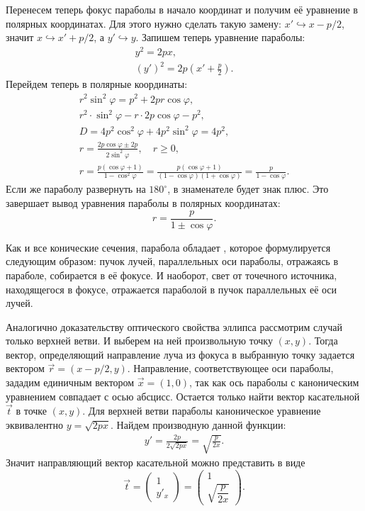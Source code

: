 Перенесем теперь фокус параболы в начало координат и получим её уравнение в полярных координатах. Для этого нужно сделать такую замену: $x' \hookrightarrow x - p/2$, значит $x \hookrightarrow x' + p/2$, а $y' \hookrightarrow y$. Запишем теперь уравнение параболы:
\begin{gather*}
	y^2 = 2px,\\
	(y')^2 = 2 p \left(x' + \frac{p}{2} \right).
\end{gather*}
Перейдем теперь в полярные координаты:
\begin{gather*}
	r^2 \sin^2 \varphi = p^2 + 2pr\cos \varphi,\\
	r^2 \cdot \sin^2 \varphi - r \cdot 2 p  \cos \varphi - p^2,\\
	D = 4p^2 \cos^2 \varphi + 4 p^2 \sin^2 \varphi = 4 p^2,\\
	r = \frac{2p \cos \varphi \pm 2p}{2\sin^2 \varphi}, \quad r \geqslant 0,\\
	r = \frac{p (\cos \varphi + 1)}{1 - \cos^2 \varphi} = \frac{p (\cos \varphi + 1)}{(1 - \cos\varphi)(1 + \cos\varphi)} = \frac{p}{1 - \cos \varphi}.
\end{gather*}
Если же параболу развернуть на $180^\circ$, в знаменателе будет знак плюс. Это завершает вывод уравнения параболы в полярных координатах:
\begin{equation}
	r = \frac{p}{1 \pm \cos \varphi}.
\end{equation}

Как и все конические сечения, парабола обладает , которое формулируется следующим образом: пучок лучей, параллельных оси параболы, отражаясь в параболе, собирается в её фокусе. И наоборот, свет от точечного источника, находящегося в фокусе, отражается параболой в пучок параллельных её оси лучей.

Аналогично доказательству оптического свойства эллипса рассмотрим случай только верхней ветви. И выберем на ней произвольную точку $(x, y)$. Тогда вектор, определяющий направление луча из фокуса в выбранную точку задается вектором $\vec r = (x - p/2, y)$. Направление, соответствующее оси параболы, зададим единичным вектором $\vec x = (1, 0)$, так как ось параболы с каноническим уравнением совпадает с осью абсцисс. Остается только найти вектор касательной $\vec t$ в точке $(x, y)$. Для верхней ветви параболы каноническое уравнение эквивалентно $y = \sqrt{2px}$. Найдем производную данной функции:
\begin{gather*}
	y' = \frac{2p}{2\sqrt{2px}} = \sqrt{\frac{p}{2x}}.
\end{gather*}
	Значит направляющий вектор касательной можно представить в виде
\begin{equation*}
	\vec t = 
	\begin{pmatrix}
		1\\
		y'_x
	\end{pmatrix} =
	\begin{pmatrix}
		1\\
		\sqrt{\dfrac{p}{2x}}
	\end{pmatrix}.
\end{equation*}

